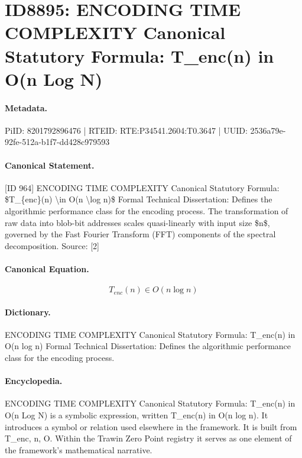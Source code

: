 \section*{ID8895: ENCODING TIME COMPLEXITY Canonical Statutory Formula: T\_enc(n) in O(n Log N)}
\paragraph{Metadata.}
PiID: 8201792896476 | RTEID: RTE:P34541.2604:T0.3647 | UUID: 2536a79e-92fe-512a-b1f7-dd428c979593

\paragraph{Canonical Statement.}
[ID 964] ENCODING TIME COMPLEXITY Canonical Statutory Formula: \$T\_\{enc\}(n) \textbackslash{}in O(n \textbackslash{}log n)\$ Formal Technical Dissertation: Defines the algorithmic performance class for the encoding process. The transformation of raw data into blob-bit addresses scales quasi-linearly with input size \$n\$, governed by the Fast Fourier Transform (FFT) components of the spectral decomposition. Source: [2]

\paragraph{Canonical Equation.}
\[
T_{enc}(n) \in O(n \log n)
\]

\paragraph{Dictionary.}
ENCODING TIME COMPLEXITY Canonical Statutory Formula: T\_enc(n) in O(n log n) Formal Technical Dissertation: Defines the algorithmic performance class for the encoding process.

\paragraph{Encyclopedia.}
ENCODING TIME COMPLEXITY Canonical Statutory Formula: T\_enc(n) in O(n Log N) is a symbolic expression, written T\_enc(n) in O(n log n). It introduces a symbol or relation used elsewhere in the framework. It is built from T\_enc, n, O. Within the Trawin Zero Point registry it serves as one element of the framework's mathematical narrative.
